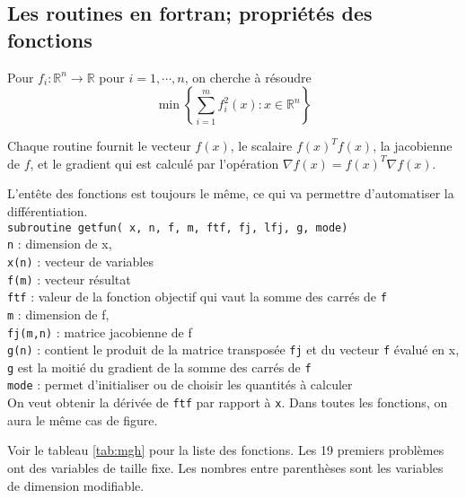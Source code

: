 \subsection{Les routines en fortran; propri\'et\'es des fonctions}


Pour $f_i : \mathbb{R}^n \rightarrow \mathbb{R}$ pour $i=1, \cdots ,n$, on cherche \`a r\'esoudre 
$$\min \left\{\sum_{i=1}^{m}f_i^2(x):x \in \mathbb{R}^n \right\} $$

Chaque routine fournit le vecteur $f(x)$, le scalaire $f(x)^Tf(x)$, la jacobienne de $f$, et le gradient qui est calcul\'e par
l'op\'eration $ \nabla f(x)=f(x)^T\nabla f(x)$.



L'entête des fonctions est toujours le même, ce qui va permettre d'automatiser la diff\'erentiation.\\
{\center\tt subroutine getfun( x, n, f, m, ftf, fj, lfj, g, mode)}\\
{\tt n} : dimension de x, \\
{\tt x(n)} : vecteur de variables\\
{\tt f(m)} : vecteur r\'esultat \\
{\tt ftf} : valeur de la fonction objectif qui vaut la somme des carr\'es de {\tt f}\\
{\tt m} : dimension de f, \\
{\tt fj(m,n)} : matrice jacobienne de f\\
{\tt g(n)} : contient le produit de la matrice transpos\'ee {\tt fj} et du vecteur {\tt f} \'evalu\'e en x,
{\tt g} est la moiti\'e du gradient de la somme des carr\'es de {\tt f}\\
{\tt mode} : permet d'initialiser ou de choisir les quantit\'es \`a calculer\\


On veut obtenir la d\'eriv\'ee de {\tt ftf} par rapport \`a {\tt x}. Dans toutes les fonctions, on aura le même cas de figure.




Voir le tableau \ref{tab:mgh} pour la liste des fonctions. Les 19 premiers probl\`emes ont des variables de taille fixe. Les nombres
entre parenth\`eses sont les variables de dimension modifiable.


